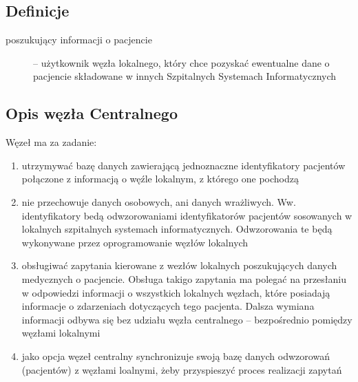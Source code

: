\documentclass[a4paper]{article}
\begin{document}
\subsection{Definicje}
\begin{description}
\item[poszukujący informacji o pacjencie] – użytkownik węzła lokalnego, który chce pozyskać ewentualne dane o pacjencie składowane w innych Szpitalnych Systemach Informatycznych
\end{description}

\subsection{Opis węzła Centralnego}
Węzeł ma za zadanie:
\begin{enumerate}
\item utrzymywać bazę danych zawierającą jednoznaczne identyfikatory pacjentów połączone z informacją o węźle lokalnym, z którego one pochodzą
\item nie przechowuje danych osobowych, ani danych wrażliwych. Ww. identyfikatory bedą odwzorowaniami identyfikatorów pacjentów sosowanych w lokalnych szpitalnych systemach informatycznych. Odwzorowania te będą wykonywane przez oprogramowanie węzłów lokalnych
\item obsługiwać zapytania kierowane z wezłów lokalnych poszukujących danych medycznych o pacjencie. Obsługa takigo zapytania ma polegać na przesłaniu w odpowiedzi informacji o wszystkich lokalnych węzłach, które posiadają informacje o zdarzeniach dotyczących tego pacjenta. Dalsza wymiana informacji odbywa się bez udziału węzła centralnego – bezpośrednio pomiędzy węzłami lokalnymi
\item jako opcja węzeł centralny synchronizuje swoją bazę danych odwzorowań (pacjentów) z węzłami loalnymi, żeby przyspieszyć proces realizacji zapytań
\end{enumerate}
\end{document}

